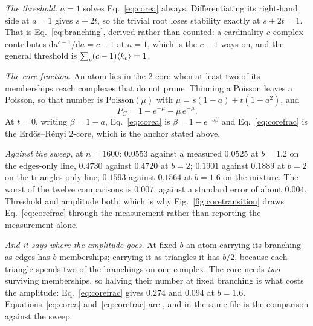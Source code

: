 \emph{The threshold.} $a=1$ solves Eq.~\eqref{eq:corea} always. Differentiating
its right-hand side at $a=1$ gives $s+2t$, so the trivial root loses stability
exactly at $s+2t=1$. That is Eq.~\eqref{eq:branching}, derived rather than
counted: a cardinality-$c$ complex contributes $\mathrm{d}a^{c-1}/\mathrm{d}a
=c-1$ at $a=1$, which is the $c-1$ ways on, and the general threshold is
$\sum_{c}(c-1)\langle k_{c} \rangle=1$.

\emph{The core fraction.} An atom lies in the $2$-core when at least two of its
memberships reach complexes that do not prune. Thinning a Poisson leaves a
Poisson, so that number is $\mathrm{Poisson}(\mu)$ with
$\mu=s(1-a)+t(1-a^{2})$, and
\begin{equation}
  P_{C}=1-e^{-\mu}-\mu\,e^{-\mu}.
  \label{eq:corefrac}
\end{equation}
At $t=0$, writing $\beta=1-a$, Eq.~\eqref{eq:corea} is $\beta=1-e^{-s\beta}$ and
Eq.~\eqref{eq:corefrac} is the Erd\H{o}s--R\'enyi $2$-core, which is the anchor
stated above.

\emph{Against the sweep}, at $n=1600$: $0.0553$ against a measured $0.0525$ at
$b=1.2$ on the edges-only line, $0.4730$ against $0.4720$ at $b=2$; $0.1901$
against $0.1889$ at $b=2$ on the triangles-only line; $0.1593$ against $0.1564$
at $b=1.6$ on the mixture. The worst of the twelve comparisons is $0.007$,
against a standard error of about $0.004$. Threshold and amplitude both, which
is why Fig.~\ref{fig:coretransition} draws Eq.~\eqref{eq:corefrac} through the
measurement rather than reporting the measurement alone.

\emph{And it says where the amplitude goes.} At fixed $b$ an atom carrying its
branching as edges has $b$ memberships; carrying it as triangles it has $b/2$,
because each triangle spends two of the branchings on one complex. The core
needs \emph{two} surviving memberships, so halving their number at fixed
branching is what costs the amplitude: Eq.~\eqref{eq:corefrac} gives $0.274$ and
$0.094$ at $b=1.6$. Equations~\eqref{eq:corea} and~\eqref{eq:corefrac} are
, and
 in the same file is the comparison
against the sweep.

